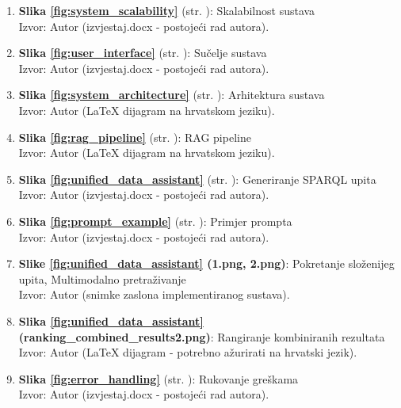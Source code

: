 \begin{enumerate}
\item \textbf{Slika \ref{fig:system_scalability}} (str. \pageref{fig:system_scalability}): Skalabilnost sustava \\
Izvor: Autor (izvjestaj.docx - postojeći rad autora).

\item \textbf{Slika \ref{fig:user_interface}} (str. \pageref{fig:user_interface}): Sučelje sustava \\
Izvor: Autor (izvjestaj.docx - postojeći rad autora).

\item \textbf{Slika \ref{fig:system_architecture}} (str. \pageref{fig:system_architecture}): Arhitektura sustava \\
Izvor: Autor (LaTeX dijagram na hrvatskom jeziku).

\item \textbf{Slika \ref{fig:rag_pipeline}} (str. \pageref{fig:rag_pipeline}): RAG pipeline \\
Izvor: Autor (LaTeX dijagram na hrvatskom jeziku).

\item \textbf{Slika \ref{fig:unified_data_assistant}} (str. \pageref{fig:unified_data_assistant}): Generiranje SPARQL upita \\
Izvor: Autor (izvjestaj.docx - postojeći rad autora).

\item \textbf{Slika \ref{fig:prompt_example}} (str. \pageref{fig:prompt_example}): Primjer prompta \\
Izvor: Autor (izvjestaj.docx - postojeći rad autora).

\item \textbf{Slike \ref{fig:unified_data_assistant} (1.png, 2.png)}: Pokretanje složenijeg upita, Multimodalno pretraživanje \\
Izvor: Autor (snimke zaslona implementiranog sustava).

\item \textbf{Slika \ref{fig:unified_data_assistant} (ranking\_combined\_results2.png)}: Rangiranje kombiniranih rezultata \\
Izvor: Autor (LaTeX dijagram - potrebno ažurirati na hrvatski jezik).

\item \textbf{Slika \ref{fig:error_handling}} (str. \pageref{fig:error_handling}): Rukovanje greškama \\
Izvor: Autor (izvjestaj.docx - postojeći rad autora).


\end{enumerate}
